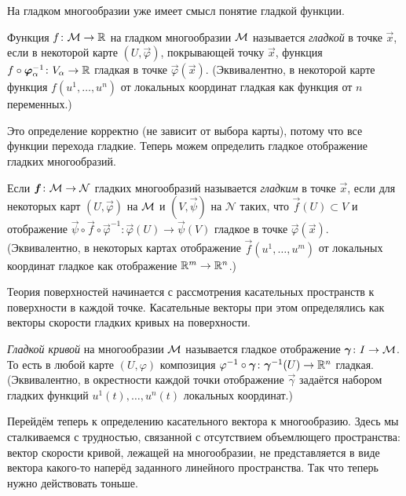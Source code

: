 
На гладком многообразии уже имеет смысл понятие гладкой функции.

\begin{definition}
	Функция $f\colon \mathcal{M} \to \mathbb{R}$ на гладком многообразии $\mathcal{M}$ называется \textit{гладкой} в точке $\vec{x}$, если в некоторой карте $(U, \vec{\varphi})$, покрывающей точку $\vec{x}$, функция $f \circ \boldsymbol{\varphi}^{-1}_\alpha\colon V_\alpha \to \mathbb{R}$ гладкая в точке $\vec{\varphi}(\vec{x})$. (Эквивалентно, в некоторой карте функция $f(u^1, \ldots, u^n)$ от локальных координат гладкая как функция от $n$ переменных.)
\end{definition}

Это определение корректно (не зависит от выбора карты), потому что все функции перехода гладкие. Теперь можем определить гладкое отображение гладких многообразий.

\begin{definition}
	Если $\boldsymbol{f}\colon\mathcal{M} \to \mathcal{N}$ гладких многообразий называется \textit{гладким} в точке $\vec{x}$, если для некоторых карт $(U, \vec{\varphi})$ на $\mathcal{M}$ и $(V, \vec{\psi})$ на $\mathcal{N}$ таких, что $\vec{f}(U) \subset V$ и отображение $\vec{\psi} \circ \vec{f} \circ \vec{\varphi}^{-1}\colon \vec{\varphi}(U) \to \vec{\psi}(V)$ гладкое в точке $\vec{\varphi}(\vec{x})$. (Эквивалентно, в некоторых картах отображение $\vec{f}(u^1, \ldots, u^m)$ от локальных координат гладкое как отображение $\mathbb{R}^m \to \mathbb{R}^n$.)
\end{definition}

Теория поверхностей начинается с рассмотрения касательных пространств к поверхности в каждой точке. Касательные векторы при этом определялись как векторы скорости гладких кривых на поверхности.

\begin{definition}
	\textit{Гладкой кривой} на многообразии $\mathcal{M}$ называется гладкое отображение $\boldsymbol{\gamma}\colon I \to \mathcal{M}$. То есть в любой карте $(U, \varphi)$ композиция $\varphi^{-1} \circ \boldsymbol{\gamma}\colon \boldsymbol{\gamma}^{-1}(U) \to \mathbb{R}^n$ гладкая. (Эквивалентно, в окрестности каждой точки отображение $\vec{\gamma}$ задаётся набором гладких функций $u^1(t), \ldots, u^n(t)$ локальных координат.)
\end{definition}

Перейдём теперь к определению касательного вектора к многообразию. Здесь мы сталкиваемся с трудностью, связанной с отсутствием объемлющего пространства: вектор скорости кривой, лежащей на многообразии, не представляется в виде вектора какого-то наперёд заданного линейного пространства. Так что теперь нужно действовать тоньше.

